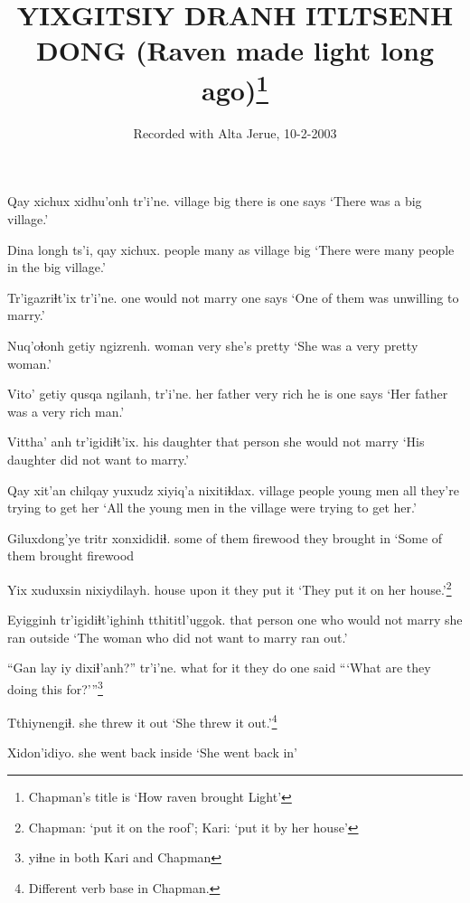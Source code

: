 \documentclass[12pt]{article}
\begin{document}
\title{YIXGITSIY DRANH ITLTSENH DONG
(Raven made light long ago)\footnote{Chapman's title is `How raven brought Light'}}

\author{Recorded with Alta Jerue, 10-2-2003}
\date{}

\maketitle

\gll Qay  xichux  xidhu'onh tr'i'ne.
village  big  {there is}  {one says}
\glt `There was a big village.'
\glend

\gll Dina  longh ts'i, qay  xichux.
people  many as village  big
\glt `There were many people in the big village.'
\glend

\gll Tr'igazriɬt'ix  tr'i'ne.
{one would not marry} {one says}
\glt `One of them was unwilling to marry.'
\glend

\gll Nuq'oɬonh getiy ngizrenh.
woman  very {she's pretty}
\glt `She was a very pretty woman.'
\glend

\gll Vito'  getiy qusqa  ngilanh, tr'i'ne.
{her father} very rich {he is}  {one says}
\glt `Her father was a very rich man.'
\glend

\gll Vittha'  anh tr'igidiɬt'ix.
{his daughter} {that person} {she would not marry}
\glt `His daughter did not want to marry.'
\glend

\gll Qay xit'an chilqay yuxudz {xiyiq'a nixitiɬdax.}
village people {young men} all  {they're trying to get her}
\glt `All the young men in the village were trying to get her.'
\glend

\gll Giluxdong'ye  tritr  xonxididiɬ.
{some of them}  firewood {they brought in} 
\glt `Some of them brought firewood
\glend

\gll  Yix xuduxsin nixiydilayh.
house {upon it}  {they put it}
\glt `They put it on her house.'\footnote{Chapman: `put it on the roof'; Kari: `put it by her house'}
\glend

\gll Eyigginh tr'igidiɬt'ighinh  tthititl'uggok.
{that person}  {one who would not marry} {she ran outside}
\glt `The woman who did not want to marry ran out.'
\glend

\gll ``Gan lay iy dixiɬ'anh?'' tr'i'ne.
what for it {they do}  {one said}
\glt ```What are they doing this for?'''\footnote{yiɬne in both Kari and Chapman}
\glend

\gll Tthiynengiɬ.
{{she threw it out}}
\glt `She threw it out.'\footnote{Different verb base in Chapman.}
\glend

\gll Xidon'idiyo.
{{she went back inside}}
\glt `She went back in'
\glend
\end{document}
